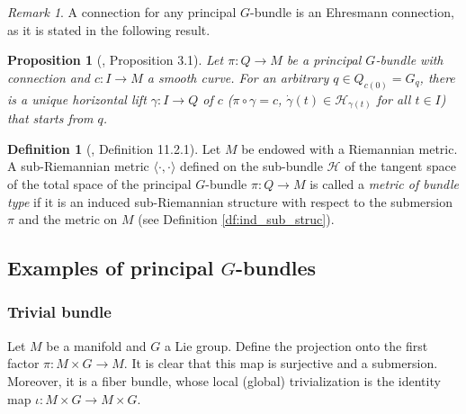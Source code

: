 \documentclass[12pt, letterpaper, reqno]{amsart}
\theoremstyle{definition}
\newtheorem{df}{Definition}
\theoremstyle{plain}
\newtheorem{prop}{Proposition}
\theoremstyle{remark}
\newtheorem{rem}{Remark}
\providecommand{\DIFaddbegin}{} %
\providecommand{\DIFaddend}{} %
\providecommand{\DIFdelbegin}{} %
\providecommand{\DIFdelend}{} %
\newcommand{\DIFscaledelfig}{0.5}
\newlength{\DIFdelgraphicswidth} %
\newlength{\DIFdelgraphicsheight} %
\newcommand{\DIFaddincludegraphics}[2][]{{\color{blue}\fbox{\DIFOincludegraphics[#1]{#2}}}} %
\newcommand{\DIFdelincludegraphics}[2][]{%
\sbox{\DIFdelgraphicsbox}{\DIFOincludegraphics[#1]{#2}}%
\settoboxwidth{\DIFdelgraphicswidth}{\DIFdelgraphicsbox} %
\settoboxtotalheight{\DIFdelgraphicsheight}{\DIFdelgraphicsbox} %
\scalebox{\DIFscaledelfig}{%
\parbox[b]{\DIFdelgraphicswidth}{\usebox{\DIFdelgraphicsbox}\\[-\baselineskip] \rule{\DIFdelgraphicswidth}{0em}}\llap{\resizebox{\DIFdelgraphicswidth}{\DIFdelgraphicsheight}{%
\setlength{\unitlength}{\DIFdelgraphicswidth}%
\begin{picture}(1,1)%
\thicklines\linethickness{2pt} %
{\color[rgb]{1,0,0}\put(0,0){\framebox(1,1){}}}%
{\color[rgb]{1,0,0}\put(0,0){\line( 1,1){1}}}%
{\color[rgb]{1,0,0}\put(0,1){\line(1,-1){1}}}%
\end{picture}%
}\hspace*{3pt}}} %
} %
\DeclareRobustCommand{\DIFaddbegin}{\DIFOaddbegin \let\includegraphics\DIFaddincludegraphics} %
\DeclareRobustCommand{\DIFaddend}{\DIFOaddend \let\includegraphics\DIFOincludegraphics} %
\DeclareRobustCommand{\DIFdelbegin}{\DIFOdelbegin \let\includegraphics\DIFdelincludegraphics} %
\DeclareRobustCommand{\DIFdelend}{\DIFOaddend \let\includegraphics\DIFOincludegraphics} %
\begin{document}
\begin{rem}
A connection for any principal $ G $-bundle is an Ehresmann connection, as it is stated in the following result. 
\end{rem}
\DIFdelbegin %
\DIFdelend \DIFaddbegin \begin{prop}[\cite{kobayashi1963foundations}, Proposition 3.1]\DIFaddend \label{prop:comp_bundle}
	Let $ \pi: Q \rightarrow M $ be a principal $ G $-bundle with connection and $ c: I \rightarrow M $ a smooth curve. For an arbitrary $ q\in Q_{c(0)}= G_q $, there is a unique horizontal lift $ \gamma: I \rightarrow Q $ of $ c $ ($\pi\circ\gamma =c$, $ \dot{\gamma}(t)\in \mathcal{H}_{\gamma(t)} $ for all $ t\in I $) that starts from $ q $.    	
\end{prop}

\DIFdelbegin %
\DIFdelend \DIFaddbegin \begin{df}[\cite{montgomery2002tour}, Definition 11.2.1]
	\DIFaddend Let $ M $ be endowed with a Riemannian metric. A sub-Riemannian metric $  \langle\cdot,\cdot\rangle $ defined on the sub-bundle $ \mathcal{H} $  of the tangent space of the total space of the principal $ G $-bundle $ \pi: Q \rightarrow {M}
	$ is called a \textit{metric of bundle type} if it is an induced sub-Riemannian structure with respect to the submersion $ \pi $ and the metric on $ M $  (see Definition \ref{df:ind_sub_struc}).
\end{df}

\subsection{Examples of principal $ G $-bundles}%
\label{sub:examples_of_principal_g_bundles}

\subsubsection{Trivial bundle}%
\label{ssub:projection_of_cartesian_product_of_manifolds}

Let $ M$ be a manifold and $ G $ a Lie group. Define the projection onto the first factor $ \pi: M\times G \rightarrow M. $ It is clear that this map is surjective and a submersion. Moreover, it is a fiber bundle, whose local (global) trivialization is the identity map $ \iota : M\times G \rightarrow M\times G $.   
\end{document}
